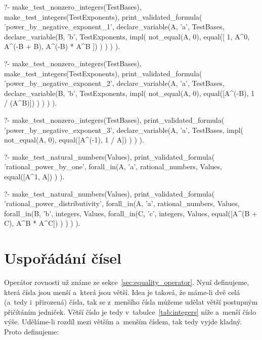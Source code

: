 \begin{prolog}
?-	make_test_nonzero_integers(TestBases),
	make_test_integers(TestExponents),
	print_validated_formula(
		'power_by_negative_exponent_1',
		declare_variable(A, 'a', TestBases,
			declare_variable(B, 'b', TestExponents,
				impl(
					not_equal(A, 0),
					equal([
						1,
						A^0,
						A^(-B + B),
						A^(-B) * A^B
					])
				)
			)
		)
	).
\end{prolog}
\begin{prolog}
?-	make_test_nonzero_integers(TestBases),
	make_test_integers(TestExponents),
	print_validated_formula(
		'power_by_negative_exponent_2',
		declare_variable(A, 'a', TestBases,
			declare_variable(B, 'b', TestExponents,
				impl(
					not_equal(A, 0),
					equal([A^(-B), 1 / (A^B)])
				)
			)
		)
	).
\end{prolog}
\begin{prolog}
?-	make_test_nonzero_integers(TestBases),
	print_validated_formula(
		'power_by_negative_exponent_3',
		declare_variable(A, 'a', TestBases,
			impl(
				not_equal(A, 0),
				equal([A^(-1), 1 / A])
			)
		)
	).
\end{prolog}


\begin{fact}
\begin{prolog}
?-	make_test_natural_numbers(Values),
	print_validated_formula(
		'rational_power_by_one',
		forall_in(A, 'a', rational_numbers, Values,
			equal([A^1, A])
		)
	).				
\end{prolog}
\begin{prolog}
?-	make_test_natural_numbers(Values),
	print_validated_formula(
		'rational_power_distributivity',
		forall_in(A, 'a', rational_numbers, Values,
			forall_in(B, 'b', integers, Values,
				forall_in(C, 'c', integers, Values,
					equal([A^(B + C), A^B * A^C])
				)
			)
		)
	).				
\end{prolog}
\end{fact}

\section{Uspořádání čísel}

Operátor rovnosti už známe ze sekce~\ref{sec:equality_operator}. Nyní definujeme, která čísla jsou menší a~která jsou větší. Idea je taková, že máme-li dvě celá (a~tedy i~přirozená) čísla, tak se z~menšího čísla můžeme udělat větší postupným přičítáním jedniček. Větší číslo je tedy v~tabulce~\ref{tab:integers} níže a~menší číslo výše. Uděláme-li rozdíl mezi větším a~menším číslem, tak tedy vyjde kladný. Proto definujeme:

